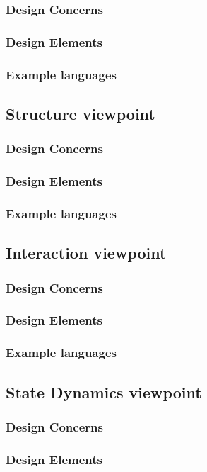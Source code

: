 \documentclass[onecolumn, draftclsnofoot,10pt, compsoc]{IEEEtran}
\begin{document}
\begin{singlespace}
		\subsubsection{Design Concerns}
		\subsubsection{Design Elements}
		\subsubsection{Example languages}
	\subsection{Structure viewpoint}
		\subsubsection{Design Concerns}
		\subsubsection{Design Elements}
		\subsubsection{Example languages}
	\subsection{Interaction viewpoint}
		\subsubsection{Design Concerns}
		\subsubsection{Design Elements}
		\subsubsection{Example languages}
	\subsection{State Dynamics viewpoint}
		\subsubsection{Design Concerns}
		\subsubsection{Design Elements}

\end{singlespace}
\end{document}
